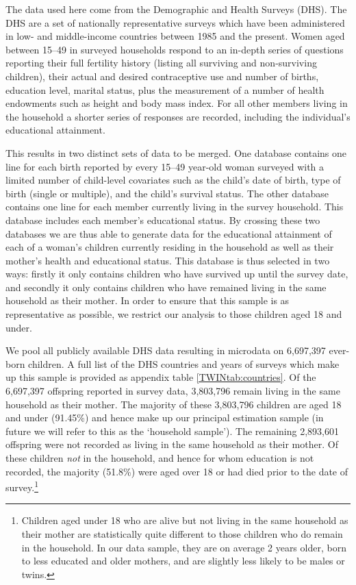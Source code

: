 The data used here come from the Demographic and Health Surveys (DHS).  The DHS 
are a set of nationally representative surveys which have been administered in 
low- and middle-income countries between 1985 and the present.  Women aged 
between 15--49 in surveyed households respond to an in-depth series of questions 
reporting their full fertility history (listing all surviving and non-surviving 
children), their actual and desired contraceptive use and number of births, 
education level, marital status, plus the measurement of a number of health 
endowments such as height and body mass index.  For all other members living in 
the household a shorter series of responses are recorded, including the 
individual's educational attainment.

This results in two distinct sets of data to be merged.  One database contains
one line for each birth reported by every 15--49 year-old woman surveyed with
a limited number of child-level covariates such as the child's date of birth,
type of birth (single or multiple), and the child's survival status.  The other
database contains one line for each member currently living in the survey 
household.  This database includes each member's educational status.  By 
crossing these two databases we are thus able to generate data for the
educational attainment of each of a woman's children currently residing in the 
household as well as their mother's health and educational status.  This 
database is thus selected in two ways: firstly it only contains children who
have survived up until the survey date, and secondly it only contains children
who have remained living in the same household as their mother.  In order to
ensure that this sample is as representative as possible, we restrict our
analysis to those children aged 18 and under.

We pool all publicly available DHS data resulting in microdata on 6,697,397 
ever-born children.  A full list of the DHS countries and years of surveys which
make up this sample is provided as appendix table \ref{TWINtab:countries}.  Of 
the 6,697,397 offspring reported in survey data, 3,803,796 remain living in the 
same household as their mother.  The majority of these 3,803,796 children are 
aged 18 and under (91.45\%) and hence make up our principal estimation sample (in 
future we will refer to this as the `household sample').  The remaining 2,893,601 
offspring were not recorded as living in the same household as their mother.  Of 
these children \emph{not} in the household, and hence for whom education is not 
recorded, the majority (51.8\%) were aged over 18 or had died prior to the date 
of survey.\footnote{Children aged under 18 who are alive but not living in the 
same household as their mother are statistically quite different to those 
children who do remain in the household.  In our data sample, they are on average 
2 years older, born to less educated and older mothers, and are slightly less 
likely to be males or twins.}
